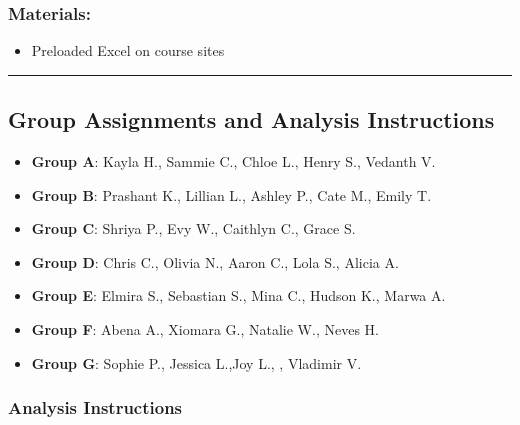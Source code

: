 \documentclass[
  letterpaper,
  DIV=11,
  numbers=noendperiod]{scrartcl}
\providecommand{\tightlist}{%
  \setlength{\itemsep}{0pt}\setlength{\parskip}{0pt}}\usepackage{longtable,booktabs,array}
\begin{document}
\hypertarget{materials}{%
\subsubsection{\texorpdfstring{{\textbf{Materials}}:}{Materials:}}\label{materials}}

\begin{itemize}
\tightlist
\item
  Preloaded Excel on course sites\\
\end{itemize}

\begin{center}\rule{0.5\linewidth}{0.5pt}\end{center}

\hypertarget{group-assignments-and-analysis-instructions}{%
\subsection{Group Assignments and Analysis
Instructions}\label{group-assignments-and-analysis-instructions}}

\begin{itemize}
\tightlist
\item
  \textbf{Group A}: Kayla H., Sammie C., Chloe L., Henry S., Vedanth
  V.\\
\item
  \textbf{Group B}: Prashant K., Lillian L., Ashley P., Cate M., Emily
  T.\\
\item
  \textbf{Group C}: Shriya P., Evy W., Caithlyn C., Grace S.\\
\item
  \textbf{Group D}: Chris C., Olivia N., Aaron C., Lola S., Alicia A.\\
\item
  \textbf{Group E}: Elmira S., Sebastian S., Mina C., Hudson K., Marwa
  A.\\
\item
  \textbf{Group F}: Abena A., Xiomara G., Natalie W., Neves H.\\
\item
  \textbf{Group G}: Sophie P., Jessica L.,Joy L., , Vladimir V.
\end{itemize}

\hypertarget{analysis-instructions}{%
\subsubsection{Analysis Instructions}\label{analysis-instructions}}
\end{document}
